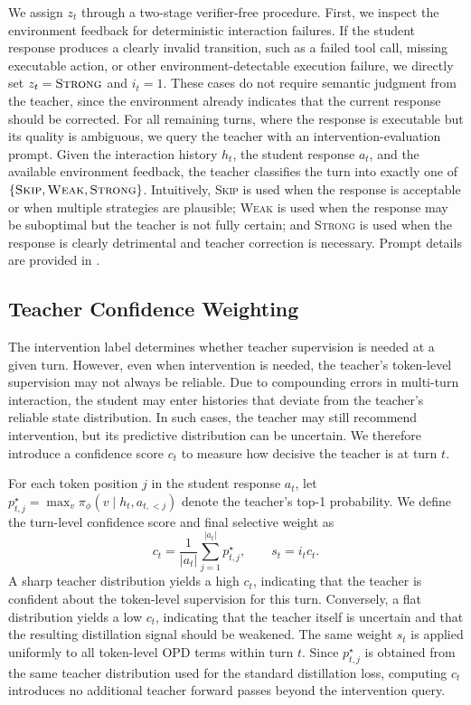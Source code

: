We assign $z_t$ through a two-stage verifier-free procedure.
%
First, we inspect the environment feedback for deterministic interaction failures.
%
If the student response produces a clearly invalid transition, such as a failed tool call, missing executable action, or other environment-detectable execution failure, we directly set $z_t=\textsc{Strong}$ and $i_t=1$.
%
These cases do not require semantic judgment from the teacher, since the environment already indicates that the current response should be corrected.
%
For all remaining turns, where the response is executable but its quality is ambiguous, we query the teacher with an intervention-evaluation prompt.
%
Given the interaction history $h_t$, the student response $a_t$, and the available environment feedback, the teacher classifies the turn into exactly one of $\{\textsc{Skip},\textsc{Weak},\textsc{Strong}\}$.
%
Intuitively, \textsc{Skip} is used when the response is acceptable or when multiple strategies are plausible; \textsc{Weak} is used when the response may be suboptimal but the teacher is not fully certain; and \textsc{Strong} is used when the response is clearly detrimental and teacher correction is necessary.
%
Prompt details are provided in .

\subsection{Teacher Confidence Weighting}

The intervention label determines whether teacher supervision is needed at a given turn.
%
However, even when intervention is needed, the teacher's token-level supervision may not always be reliable.
%
Due to compounding errors in multi-turn interaction, the student may enter histories that deviate from the teacher's reliable state distribution.
%
In such cases, the teacher may still recommend intervention, but its predictive distribution can be uncertain.
%
We therefore introduce a confidence score $c_t$ to measure how decisive the teacher is at turn $t$.

For each token position $j$ in the student response $a_t$, let $p^\star_{t,j}=\max_v\pi_\phi(v\mid h_t,a_{t,<j})$ denote the teacher's top-1 probability.
%
We define the turn-level confidence score and final selective weight as
\begin{equation}
\label{eq:confidence_weight}
c_t =
\frac{1}{|a_t|}
\sum_{j=1}^{|a_t|}
p^\star_{t,j},
\qquad
s_t = i_t c_t .
\end{equation}
%
A sharp teacher distribution yields a high $c_t$, indicating that the teacher is confident about the token-level supervision for this turn.
%
Conversely, a flat distribution yields a low $c_t$, indicating that the teacher itself is uncertain and that the resulting distillation signal should be weakened.
%
The same weight $s_t$ is applied uniformly to all token-level OPD terms within turn $t$.
%
Since $p^\star_{t,j}$ is obtained from the same teacher distribution used for the standard distillation loss, computing $c_t$ introduces no additional teacher forward passes beyond the intervention query.

